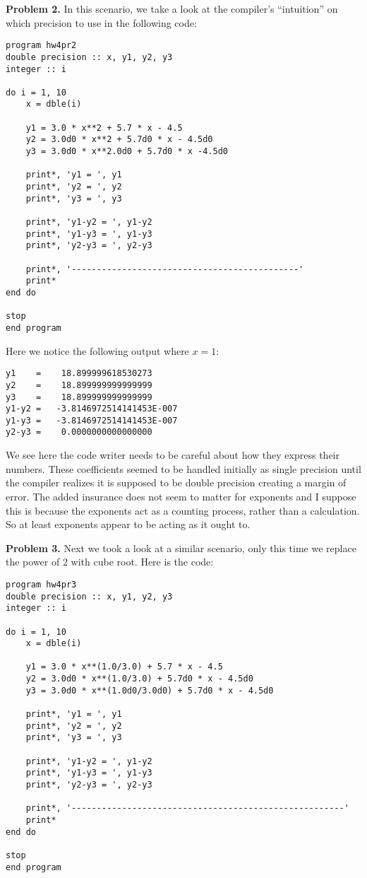 \documentclass[12pt]{article}
\begin{document}
\bigskip
\textbf{Problem 2.} In this scenario, we take a look at the compiler's ``intuition'' on which precision to use in the following code:
\begin{verbatim}
program hw4pr2
double precision :: x, y1, y2, y3
integer :: i 

do i = 1, 10
	x = dble(i)
	
	y1 = 3.0 * x**2 + 5.7 * x - 4.5
	y2 = 3.0d0 * x**2 + 5.7d0 * x - 4.5d0
	y3 = 3.0d0 * x**2.0d0 + 5.7d0 * x -4.5d0
	
	print*, 'y1 = ', y1
	print*, 'y2 = ', y2
	print*, 'y3 = ', y3
	
	print*, 'y1-y2 = ', y1-y2
	print*, 'y1-y3 = ', y1-y3
	print*, 'y2-y3 = ', y2-y3
	
	print*, '---------------------------------------------'
	print*
end do

stop
end program
\end{verbatim}

\bigskip
\noindent Here we notice the following output where $x=1$:
\begin{verbatim}
y1    =    18.899999618530273
y2    =    18.899999999999999
y3    =    18.899999999999999
y1-y2 =   -3.8146972514141453E-007
y1-y3 =   -3.8146972514141453E-007
y2-y3 =    0.0000000000000000
\end{verbatim}

\bigskip
We see here the code writer needs to be careful about how they express their numbers. These coefficients seemed to be handled initially as single precision until the compiler realizes it is supposed to be double precision creating a margin of error. The added insurance does not seem to matter for exponents and I suppose this is because the exponents act as a counting process, rather than a calculation. So at least exponents appear to be acting as it ought to.

\bigskip
\textbf{Problem 3.} Next we took a look at a similar scenario, only this time we replace the power of 2 with cube root. Here is the code:
\begin{verbatim}
program hw4pr3
double precision :: x, y1, y2, y3
integer :: i 

do i = 1, 10
	x = dble(i)
	
	y1 = 3.0 * x**(1.0/3.0) + 5.7 * x - 4.5
	y2 = 3.0d0 * x**(1.0/3.0) + 5.7d0 * x - 4.5d0
	y3 = 3.0d0 * x**(1.0d0/3.0d0) + 5.7d0 * x - 4.5d0
	
	print*, 'y1 = ', y1
	print*, 'y2 = ', y2
	print*, 'y3 = ', y3
	
	print*, 'y1-y2 = ', y1-y2
	print*, 'y1-y3 = ', y1-y3
	print*, 'y2-y3 = ', y2-y3
	
	print*, '------------------------------------------------------'
	print*
end do

stop
end program
\end{verbatim}
\end{document}
